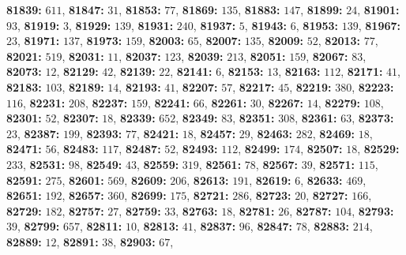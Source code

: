 \textsf{\bfseries 81839:} $611$, \textsf{\bfseries 81847:} $31$, \textsf{\bfseries 81853:} $77$, \textsf{\bfseries 81869:} $135$, \textsf{\bfseries 81883:} $147$, \textsf{\bfseries 81899:} $24$, \textsf{\bfseries 81901:} $93$, \textsf{\bfseries 81919:} $3$, \textsf{\bfseries 81929:} $139$, \textsf{\bfseries 81931:} $240$, \textsf{\bfseries 81937:} $5$, \textsf{\bfseries 81943:} $6$, \textsf{\bfseries 81953:} $139$, \textsf{\bfseries 81967:} $23$, \textsf{\bfseries 81971:} $137$, \textsf{\bfseries 81973:} $159$, \textsf{\bfseries 82003:} $65$, \textsf{\bfseries 82007:} $135$, \textsf{\bfseries 82009:} $52$, \textsf{\bfseries 82013:} $77$, \textsf{\bfseries 82021:} $519$, \textsf{\bfseries 82031:} $11$, \textsf{\bfseries 82037:} $123$, \textsf{\bfseries 82039:} $213$, \textsf{\bfseries 82051:} $159$, \textsf{\bfseries 82067:} $83$, \textsf{\bfseries 82073:} $12$, \textsf{\bfseries 82129:} $42$, \textsf{\bfseries 82139:} $22$, \textsf{\bfseries 82141:} $6$, \textsf{\bfseries 82153:} $13$, \textsf{\bfseries 82163:} $112$, \textsf{\bfseries 82171:} $41$, \textsf{\bfseries 82183:} $103$, \textsf{\bfseries 82189:} $14$, \textsf{\bfseries 82193:} $41$, \textsf{\bfseries 82207:} $57$, \textsf{\bfseries 82217:} $45$, \textsf{\bfseries 82219:} $380$, \textsf{\bfseries 82223:} $116$, \textsf{\bfseries 82231:} $208$, \textsf{\bfseries 82237:} $159$, \textsf{\bfseries 82241:} $66$, \textsf{\bfseries 82261:} $30$, \textsf{\bfseries 82267:} $14$, \textsf{\bfseries 82279:} $108$, \textsf{\bfseries 82301:} $52$, \textsf{\bfseries 82307:} $18$, \textsf{\bfseries 82339:} $652$, \textsf{\bfseries 82349:} $83$, \textsf{\bfseries 82351:} $308$, \textsf{\bfseries 82361:} $63$, \textsf{\bfseries 82373:} $23$, \textsf{\bfseries 82387:} $199$, \textsf{\bfseries 82393:} $77$, \textsf{\bfseries 82421:} $18$, \textsf{\bfseries 82457:} $29$, \textsf{\bfseries 82463:} $282$, \textsf{\bfseries 82469:} $18$, \textsf{\bfseries 82471:} $56$, \textsf{\bfseries 82483:} $117$, \textsf{\bfseries 82487:} $52$, \textsf{\bfseries 82493:} $112$, \textsf{\bfseries 82499:} $174$, \textsf{\bfseries 82507:} $18$, \textsf{\bfseries 82529:} $233$, \textsf{\bfseries 82531:} $98$, \textsf{\bfseries 82549:} $43$, \textsf{\bfseries 82559:} $319$, \textsf{\bfseries 82561:} $78$, \textsf{\bfseries 82567:} $39$, \textsf{\bfseries 82571:} $115$, \textsf{\bfseries 82591:} $275$, \textsf{\bfseries 82601:} $569$, \textsf{\bfseries 82609:} $206$, \textsf{\bfseries 82613:} $191$, \textsf{\bfseries 82619:} $6$, \textsf{\bfseries 82633:} $469$, \textsf{\bfseries 82651:} $192$, \textsf{\bfseries 82657:} $360$, \textsf{\bfseries 82699:} $175$, \textsf{\bfseries 82721:} $286$, \textsf{\bfseries 82723:} $20$, \textsf{\bfseries 82727:} $166$, \textsf{\bfseries 82729:} $182$, \textsf{\bfseries 82757:} $27$, \textsf{\bfseries 82759:} $33$, \textsf{\bfseries 82763:} $18$, \textsf{\bfseries 82781:} $26$, \textsf{\bfseries 82787:} $104$, \textsf{\bfseries 82793:} $39$, \textsf{\bfseries 82799:} $657$, \textsf{\bfseries 82811:} $10$, \textsf{\bfseries 82813:} $41$, \textsf{\bfseries 82837:} $96$, \textsf{\bfseries 82847:} $78$, \textsf{\bfseries 82883:} $214$, \textsf{\bfseries 82889:} $12$, \textsf{\bfseries 82891:} $38$, \textsf{\bfseries 82903:} $67$, 
